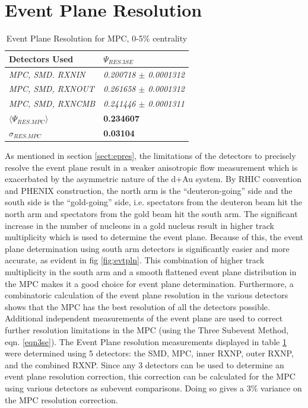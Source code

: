 \section{Event Plane Resolution}
\label{secteperr}
\begin{table}[htbp!]
\centering
\caption{Event Plane Resolution for MPC, 0-5\% centrality}
\label{EPrestable}
\begin{tabular}{|l|l|}
\hline
\textbf{Detectors Used}     & \textbf{$\Psi_{RES.3SE}$}       \\ \hline
\textit{MPC, SMD. RXNIN}    & \textit{0.200718 $\pm$ 0.0001312} \\ \hline
\textit{MPC, SMD, RXNOUT}   & \textit{0.261658 $\pm$ 0.0001312} \\ \hline
\textit{MPC, SMD, RXNCMB}   & \textit{0.241446 $\pm$ 0.0001311} \\ \hline
\textbf{$\langle\Psi_{RES.MPC}\rangle$}            & \textbf{0.234607}               \\ \hline
\textbf{$\sigma_{RES.MPC}$} & \textbf{0.03104}                \\ \hline
\end{tabular}
\end{table}
As mentioned in section \ref{sect:epres}, the limitations of the detectors to precisely resolve the event plane result in a weaker anisotropic flow measurement which is exacerbated by the asymmetric nature of the d+Au system. By RHIC convention and PHENIX construction, the north arm is the ``deuteron-going'' side and the south side is the ``gold-going'' side, i.e. spectators from the deuteron beam hit the north arm and spectators from the gold beam hit the south arm. The significant increase in the number of nucleons in a gold nucleus result in higher track multiplicity which is used to determine the event plane. Because of this, the event plane determination using south arm detectors is significantly easier and more accurate, as evident in fig \ref{fig:evtpln}. This combination of higher track multiplicity in the south arm and a smooth flattened event plane distribution in the MPC makes it a good choice for event plane determination. Furthermore, a combinatoric calculation of the event plane resolution in the various detectors shows that the MPC has the best resolution of all the detectors possible. Additional independent measurements of the event plane are used to correct further resolution limitations in the MPC (using the Three Subevent Method, eqn. \ref{eqn3se}). The Event Plane resolution measurements displayed in table \ref{EPrestable} were determined using 5 detectors: the SMD, MPC, inner RXNP, outer RXNP, and the combined RXNP. Since any 3 detectors can be used to determine an event plane resolution correction, this correction can be calculated for the MPC using various detectors as subevent comparisons. Doing so gives a 3\% variance on the MPC resolution correction.

